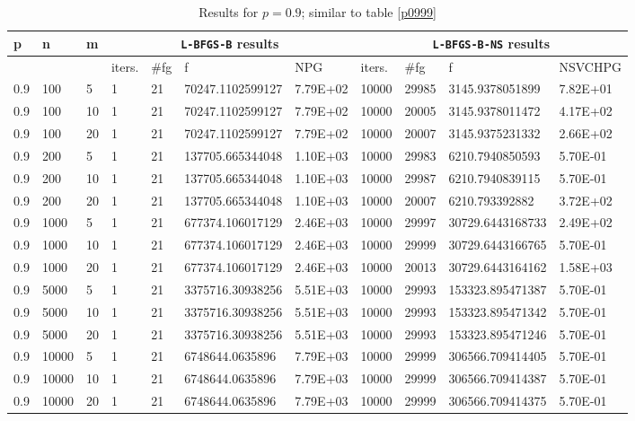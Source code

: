 \begin{table}
  \tiny
  \begin{center}
    \begin{tabular}{|l|l|l|l|l|l|l|l|l|l|l|}
      \hline
      p  & n & m  & \multicolumn{4}{|c|}{\texttt{L-BFGS-B} results} & \multicolumn{4}{|c|}{\texttt{L-BFGS-B-NS} results} \\ \hline
      &  &  & iters. & \#fg & f & NPG & iters. & \#fg & f & NSVCHPG \\ \hline
      0.9 & 100 & 5 & 1 & 21 & 70247.1102599127 & 7.79E+02 & 10000 & 29985 & 3145.9378051899 & 7.82E+01\\
      0.9 & 100 & 10 & 1 & 21 & 70247.1102599127 & 7.79E+02 & 10000 & 20005 & 3145.9378011472 & 4.17E+02\\
      0.9 & 100 & 20 & 1 & 21 & 70247.1102599127 & 7.79E+02 & 10000 & 20007 & 3145.9375231332 & 2.66E+02\\
      0.9 & 200 & 5 & 1 & 21 & 137705.665344048 & 1.10E+03 & 10000 & 29983 & 6210.7940850593 & 5.70E-01\\
      0.9 & 200 & 10 & 1 & 21 & 137705.665344048 & 1.10E+03 & 10000 & 29987 & 6210.7940839115 & 5.70E-01\\
      0.9 & 200 & 20 & 1 & 21 & 137705.665344048 & 1.10E+03 & 10000 & 20007 & 6210.793392882 & 3.72E+02\\
      0.9 & 1000 & 5 & 1 & 21 & 677374.106017129 & 2.46E+03 & 10000 & 29997 & 30729.6443168733 & 2.49E+02\\
      0.9 & 1000 & 10 & 1 & 21 & 677374.106017129 & 2.46E+03 & 10000 & 29999 & 30729.6443166765 & 5.70E-01\\
      0.9 & 1000 & 20 & 1 & 21 & 677374.106017129 & 2.46E+03 & 10000 & 20013 & 30729.6443164162 & 1.58E+03\\
      0.9 & 5000 & 5 & 1 & 21 & 3375716.30938256 & 5.51E+03 & 10000 & 29993 & 153323.895471387 & 5.70E-01\\
      0.9 & 5000 & 10 & 1 & 21 & 3375716.30938256 & 5.51E+03 & 10000 & 29993 & 153323.895471342 & 5.70E-01\\
      0.9 & 5000 & 20 & 1 & 21 & 3375716.30938256 & 5.51E+03 & 10000 & 29993 & 153323.895471246 & 5.70E-01\\
      0.9 & 10000 & 5 & 1 & 21 & 6748644.0635896 & 7.79E+03 & 10000 & 29999 & 306566.709414405 & 5.70E-01\\
      0.9 & 10000 & 10 & 1 & 21 & 6748644.0635896 & 7.79E+03 & 10000 & 29999 & 306566.709414387 & 5.70E-01\\
      0.9 & 10000 & 20 & 1 & 21 & 6748644.0635896 & 7.79E+03 & 10000 & 29999 & 306566.709414375 & 5.70E-01\\
      \hline
    \end{tabular}
    \caption[A value where \texttt{L-BFGS-B-NS} is supposed to fail. $p = 0.9$]{Results for $p = 0.9$; similar to table \ref{p0999}}
    \label{p09}
  \end{center}
\end{table}

